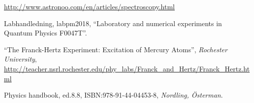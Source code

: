 \begin{thebibliography}{99}
\label{sec:ref}

	\url{http://www.astronoo.com/en/articles/spectroscopy.html}
	
	Labhandledning, labpm2018, ``Laboratory and numerical experiments in Quantum Physics F0047T''.
	
	``The Franck-Hertz Experiment: Excitation of Mercury Atoms'', \emph{Rochester University},
	\url{http://teacher.nsrl.rochester.edu/phy_labs/Franck_and_Hertz/Franck_Hertz.html}
	
	Physics handbook, ed.8.8, ISBN:978-91-44-04453-8, \emph{Nordling, Österman}.
	
\end{thebibliography}